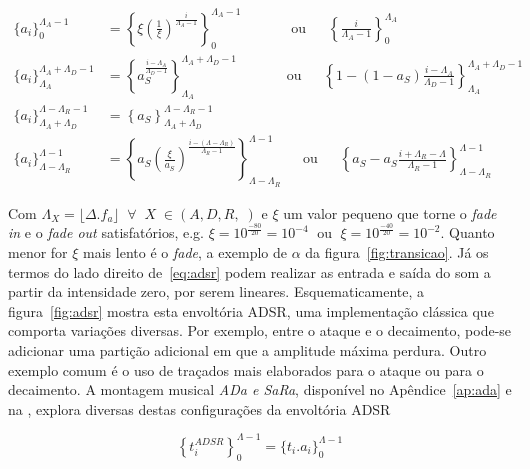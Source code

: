 \begin{equation}\label{eq:adsr}
\begin{split}
\{a_i\}_0^{\Lambda_A-1} & = \left\{\xi\left(\frac{1}{\xi}\right)^{\frac{i}{\Lambda_A-1}}\right\}_0^{\Lambda_A-1} \;\;\quad\quad\quad \text{ou} \;\;\quad \left\{\frac{i}{\Lambda_A-1}\right\}_0^{\Lambda_A}\\
\{a_i\}_{\Lambda_A}^{\Lambda_A+\Lambda_D-1} & =\left\{a_S^{\frac{i-\Lambda_A}{\Lambda_D-1}}  \right\}_{\Lambda_A}^{\Lambda_A+\Lambda_D-1} \;\;\quad \quad\quad \text{ou} \quad\;\; \left\{1-(1-a_S)\frac{i-\Lambda_A}{\Lambda_D-1}\right\}_{\Lambda_A}^{\Lambda_A+\Lambda_D-1}\\
\{ a_i \}_{\Lambda_A+\Lambda_D}^{\Lambda-\Lambda_R-1} & =\left\{ a_S \right\}_{\Lambda_A+\Lambda_D}^{\Lambda-\Lambda_R-1} \\
\{ a_i \}_{\Lambda-\Lambda_R}^{\Lambda-1} & =\left\{ a_S\left(\frac{\xi}{a_S} \right)^{\frac{i-(\Lambda-\Lambda_R)}{\Lambda_R-1}} \right\}_{\Lambda-\Lambda_R}^{\Lambda-1} \quad\;\; \text{ou} \quad\;\; \left\{ a_S - a_S\frac{i+\Lambda_R-\Lambda}{\Lambda_R-1}\right\}_{\Lambda-\Lambda_R}^{\Lambda-1} 
\end{split}
\end{equation}

Com $\Lambda_X=\lfloor \Delta . f_a \rfloor\;\;\forall\;\; X \; \in (A,D,R,\;)$ e $\xi$ um valor pequeno que torne o \emph{fade in} e o \emph{fade out} satisfatórios, e.g. $\xi=10^{\frac{-80}{20}}=10^{-4}\;$ ou $\;\xi=10^{\frac{-40}{20}}=10^{-2}$. Quanto menor for $\xi$ mais lento é o \emph{fade}, a exemplo de $\alpha$ da figura~\ref{fig:transicao}. Já os termos do lado direito de~\ref{eq:adsr} podem realizar as entrada e saída do som a partir da intensidade zero, por serem lineares. 
Esquematicamente, a figura~\ref{fig:adsr} mostra esta envoltória ADSR, 
uma implementação clássica que comporta variações diversas. Por exemplo,
entre o ataque e o decaimento, pode-se adicionar uma partição adicional em que a amplitude
máxima perdura. Outro exemplo comum é o uso de traçados mais elaborados para o
ataque ou para o decaimento. A montagem musical \emph{ADa e SaRa}, disponível no Apêndice~\ref{ap:ada}
e na \massa, explora diversas destas configurações da envoltória ADSR


\begin{equation}
\left\{t_i^{ADSR}\right\}_0^{\Lambda-1} =\{t_i . a_i\}_0^{\Lambda-1}
\end{equation}


